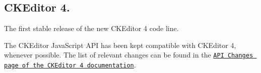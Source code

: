 {\ttfamily \subsection*{C\+K\+Editor 4.}}

{\ttfamily }

{\ttfamily The first stable release of the new C\+K\+Editor 4 code line.}

{\ttfamily The C\+K\+Editor Java\+Script A\+PI has been kept compatible with C\+K\+Editor 4, whenever possible. The list of relevant changes can be found in the \href{http://docs.ckeditor.com/#!/guide/dev_api_changes}{\tt A\+PI Changes page of the C\+K\+Editor 4 documentation}. }